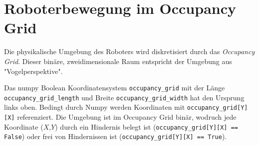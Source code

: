 \vspace*{-5cm}
\chapter{Roboterbewegung im Occupancy Grid}
Die physikalische Umgebung des Roboters wird diskretisiert durch das \textit{Occupancy Grid}.
Dieser binäre, zweidimensionale Raum entspricht der Umgebung aus "Vogelperspektive". 

Das numpy Boolean Koordinatensystem \texttt{occupancy\_grid} mit der Länge \texttt{occupancy\_grid\_length} und Breite \texttt{occupancy\_grid\_width} hat den Ursprung links oben. Bedingt durch Numpy werden Koordinaten mit \texttt{occupancy\_grid[Y][X]} referenziert. Die Umgebung ist im Occupancy Grid binär, wodruch jede Koordinate ($X$,$Y$) durch ein Hindernis belegt ist (\texttt{occupancy\_grid[Y][X] == False}) oder frei von Hindernissen ist (\texttt{occupancy\_grid[Y][X] == True}).

